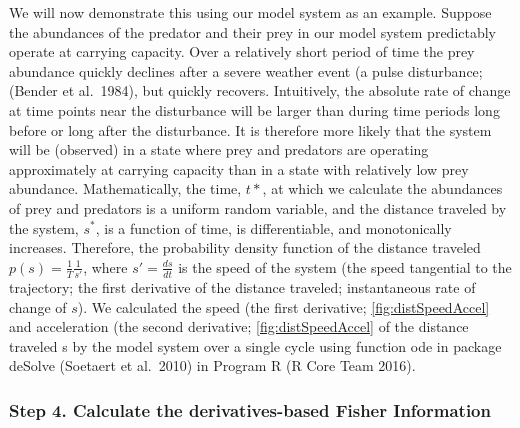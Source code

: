 \documentclass[12pt,twoside]{reedthesis}
\begin{document}
We will now demonstrate this using our model system as an example. Suppose the abundances of the predator and their prey in our model system predictably operate at carrying capacity. Over a relatively short period of time the prey abundance quickly declines after a severe weather event (a pulse disturbance; (Bender et al.~1984), but quickly recovers. Intuitively, the absolute rate of change at time points near the disturbance will be larger than during time periods long before or long after the disturbance. It is therefore more likely that the system will be (observed) in a state where prey and predators are operating approximately at carrying capacity than in a state with relatively low prey abundance. Mathematically, the time, \(t*\), at which we calculate the abundances of prey and predators is a uniform random variable, and the distance traveled by the system, \(s^*\), is a function of time, is differentiable, and monotonically increases. Therefore, the probability density function of the distance traveled \(p(s)=\frac{1}{T}\frac{1}{s'}\), where \(s'= \frac{ds}{dt}\) is the speed of the system (the speed tangential to the trajectory; the first derivative of the distance traveled; instantaneous rate of change of \(s\)). We calculated the speed (the first derivative; \ref{fig:distSpeedAccel} and acceleration (the second derivative; \ref{fig:distSpeedAccel} of the distance traveled s by the model system over a single cycle using function ode in package deSolve (Soetaert et al.~2010) in Program R (R Core Team 2016).

\hypertarget{step-4.-calculate-the-derivatives-based-fisher-information}{%
\subsubsection{\texorpdfstring{\textbf{Step 4.} Calculate the derivatives-based Fisher Information}{Step 4. Calculate the derivatives-based Fisher Information}}\label{step-4.-calculate-the-derivatives-based-fisher-information}}
\end{document}
